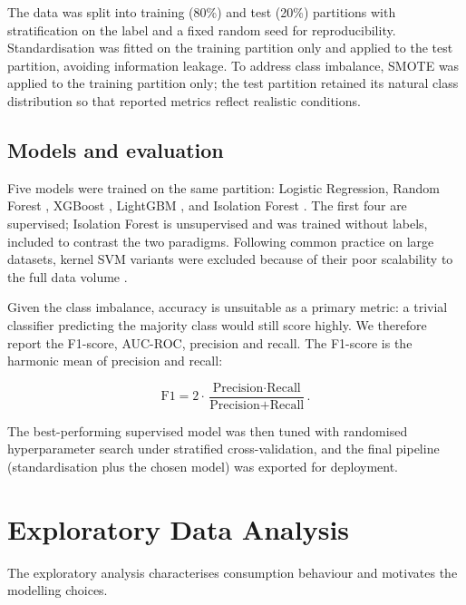 \documentclass[pdflatex,sn-mathphys-num]{sn-jnl}%
\theoremstyle{thmstyleone}%
\theoremstyle{thmstyletwo}%
\theoremstyle{thmstylethree}%
\begin{document}
The data was split into training (80\%) and test (20\%) partitions with stratification on the label and a fixed random seed for reproducibility. Standardisation was fitted on the training partition only and applied to the test partition, avoiding information leakage. To address class imbalance, SMOTE \cite{chawla2002} was applied to the training partition only; the test partition retained its natural class distribution so that reported metrics reflect realistic conditions.

\subsection{Models and evaluation}\label{subsec:models}

Five models were trained on the same partition: Logistic Regression, Random Forest \cite{breiman2001random}, XGBoost \cite{chen2016xgboost}, LightGBM \cite{ke2017lightgbm}, and Isolation Forest \cite{liu2008isolation}. The first four are supervised; Isolation Forest is unsupervised and was trained without labels, included to contrast the two paradigms. Following common practice on large datasets, kernel SVM variants were excluded because of their poor scalability to the full data volume \cite{pedregosa2011scikit}.

Given the class imbalance, accuracy is unsuitable as a primary metric: a trivial classifier predicting the majority class would still score highly. We therefore report the F1-score, AUC-ROC, precision and recall. The F1-score is the harmonic mean of precision and recall:

\begin{equation}
\text{F1} = 2 \cdot \frac{\text{Precision} \cdot \text{Recall}}{\text{Precision} + \text{Recall}}.
\label{eq:f1}
\end{equation}

The best-performing supervised model was then tuned with randomised hyperparameter search under stratified cross-validation, and the final pipeline (standardisation plus the chosen model) was exported for deployment.

\section{Exploratory Data Analysis}\label{sec5}

The exploratory analysis characterises consumption behaviour and motivates the modelling choices.
\end{document}
